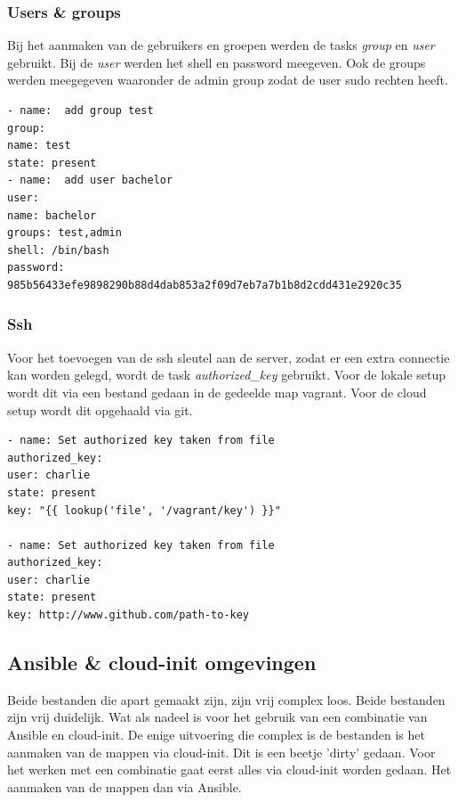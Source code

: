 \subsubsection{Users \& groups}
Bij het aanmaken van de gebruikers en groepen werden de tasks \textit{group} en \textit{user} gebruikt. Bij de \textit{user} werden het shell en password meegeven. Ook de groups werden meegegeven waaronder de admin group zodat de user sudo rechten heeft.
\begin{lstlisting}
- name:  add group test
group:
name: test
state: present
- name:  add user bachelor
user:
name: bachelor
groups: test,admin
shell: /bin/bash
password: 985b56433efe9898290b88d4dab853a2f09d7eb7a7b1b8d2cdd431e2920c35
\end{lstlisting}

\subsubsection{Ssh}
Voor het toevoegen van de ssh sleutel aan de server, zodat er een extra connectie kan worden gelegd, wordt de task \textit{authorized\_key} gebruikt. Voor de lokale setup wordt dit via een bestand gedaan in de gedeelde map vagrant. Voor de cloud setup wordt dit opgehaald via git.
\begin{lstlisting}
- name: Set authorized key taken from file
authorized_key:
user: charlie
state: present
key: "{{ lookup('file', '/vagrant/key') }}"

- name: Set authorized key taken from file
authorized_key:
user: charlie
state: present
key: http://www.github.com/path-to-key
\end{lstlisting}

\subsection{Ansible \& cloud-init omgevingen}
Beide bestanden die apart gemaakt zijn, zijn vrij complex loos. Beide bestanden zijn vrij duidelijk. Wat als nadeel is voor het gebruik van een combinatie van Ansible en cloud-init. De enige uitvoering die complex is de bestanden is het aanmaken van de mappen via cloud-init. Dit is een beetje 'dirty' gedaan. Voor het werken met een combinatie gaat eerst alles via cloud-init worden gedaan. Het aanmaken van de mappen dan via Ansible.


